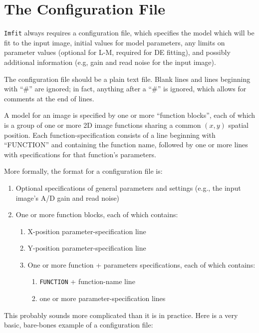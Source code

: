 \documentclass[10pt]{article}
\begin{document}
\section{The Configuration File}\label{sec:configfile}

\texttt{Imfit} always requires a configuration file, which specifies the
model which will be fit to the input image, initial values for model parameters, any limits on
parameter values (optional for L-M, required for DE fitting), and
possibly additional information (e.g, gain and read noise for the
input image).

The configuration file should be a plain text file. Blank lines and
lines beginning with ``\#'' are ignored; in fact, anything after a
``\#'' is ignored, which allows for comments at the end of lines.

A model for an image is specified by one or more ``function blocks'',
each of which is a group of one or more 2D image functions sharing a
common $(x,y)$ spatial position. Each function-specification consists of
a line beginning with ``FUNCTION'' and containing the function name,
followed by one or more lines with specifications for that function's parameters.

\bigskip

More formally, the format for a configuration file is:
\begin{enumerate}
\item Optional specifications of general parameters and settings (e.g., the
input image's A/D gain and read noise)
\item One or more function blocks, each of which contains:
\begin{enumerate}
\item X-position parameter-specification line
\item Y-position parameter-specification line
\item One or more function + parameters specifications, each of which contains:
\begin{enumerate}
\item \texttt{FUNCTION} + function-name line
\item one or more parameter-specification lines
\end{enumerate}
\end{enumerate}
\end{enumerate}

This probably sounds more complicated than it is in practice.
Here is a very basic, bare-bones example of a configuration file:
\end{document}
